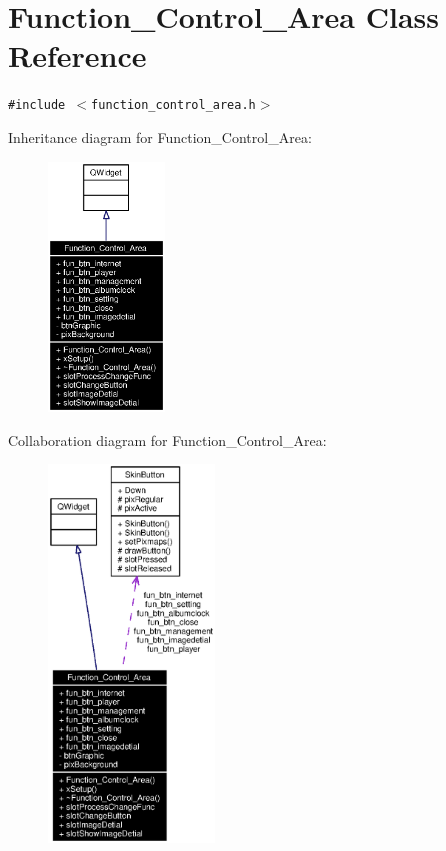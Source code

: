 \section{Function\_\-Control\_\-Area Class Reference}
\label{classFunction__Control__Area}
{\tt \#include $<$function\_\-control\_\-area.h$>$}

Inheritance diagram for Function\_\-Control\_\-Area:\begin{figure}[H]
\begin{center}
\leavevmode
\includegraphics[width=88pt]{classFunction__Control__Area__inherit__graph}
\end{center}
\end{figure}
Collaboration diagram for Function\_\-Control\_\-Area:\begin{figure}[H]
\begin{center}
\leavevmode
\includegraphics[width=125pt]{classFunction__Control__Area__coll__graph}
\end{center}
\end{figure}


